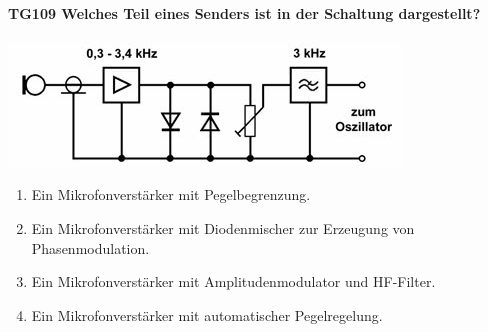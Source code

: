 \documentclass[8pt]{article}
\begin{document}
\paragraph*{TG109 Welches Teil eines Senders ist in der Schaltung dargestellt?}
\begin{center}
	\begin{minipage}{\linewidth}
		\centering
		\includegraphics[scale=1.0]{pics/tg109_a.jpg}
	\end{minipage}
\end{center}
\begin{enumerate}[nolistsep,label=\Alph*]
\item Ein Mikrofonverstärker mit Pegelbegrenzung.
\item Ein Mikrofonverstärker mit Diodenmischer zur Erzeugung von Phasenmodulation.
\item Ein Mikrofonverstärker mit Amplitudenmodulator und HF-Filter.
\item Ein Mikrofonverstärker mit automatischer Pegelregelung.
\end{enumerate}
\end{document}
